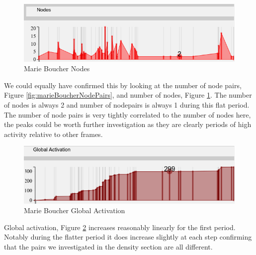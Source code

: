 \begin{figure}[h!]
  \begin{center}
  \includegraphics[trim={0 0 0 0}, width=140mm]{./Figures/marieBoucherNodes.png}
  \caption{Marie Boucher Nodes}
  \label{fig:marieBoucherNodes}
  \end{center}
\end{figure}

We could equally have confirmed this by looking at the number of node pairs, Figure \ref{fig:marieBoucherNodePairs}, and number of nodes, Figure \ref{fig:marieBoucherNodes}. The number of nodes is always 2 and number of nodepairs is always 1 during this flat period. The number of node pairs is very tightly correlated to the number of nodes here, the peaks could be worth further investigation as they are clearly periods of high activity relative to other frames.

\begin{figure}[h!]
  \begin{center}
  \includegraphics[trim={0 0 0 0}, width=140mm]{./Figures/marieBoucherGlobalActivation.png}
  \caption{Marie Boucher Global Activation}
  \label{fig:marieBoucherGlobalActivation}
  \end{center}
\end{figure}
Global activation, Figure \ref{fig:marieBoucherGlobalActivation} increases reasonably linearly for the first period. Notably during the flatter period it does increase slightly at each step confirming that the pairs we investigated in the density section are all different. 

